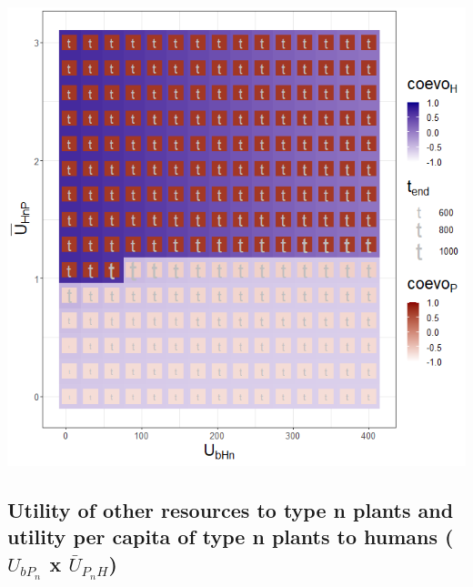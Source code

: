 \documentclass[
]{book}
\begin{document}
\includegraphics[width=1\linewidth]{plots/3_twoPar-U.bHn-mU.HnP_plot}

\newpage

\hypertarget{utility-of-other-resources-to-type-n-plants-and-utility-per-capita-of-type-n-plants-to-humans-u_bp_n-x-baru_p_nh}{%
\subsection{\texorpdfstring{Utility of other resources to type n plants and utility per capita of type n plants to humans (\(U_{bP_{n}}\) x \(\bar{U}_{P_{n}H}\))}{Utility of other resources to type n plants and utility per capita of type n plants to humans (U\_\{bP\_\{n\}\} x \textbackslash bar\{U\}\_\{P\_\{n\}H\})}}\label{utility-of-other-resources-to-type-n-plants-and-utility-per-capita-of-type-n-plants-to-humans-u_bp_n-x-baru_p_nh}}
\end{document}
